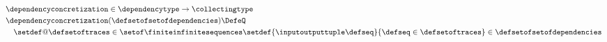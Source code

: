 \begin{align*}
  &\dependencyconcretization \in \dependencytype \to \collectingtype \\
  &\dependencyconcretization(\defsetofsetofdependencies) \DefeQ \\
  &\quad \setdef@{
    \defsetoftraces\in\setof\finiteinfinitesequences
  }{
    \setdef{\inputoutputtuple\defseq}{\defseq\in\defsetoftraces} \in \defsetofsetofdependencies
  }
\end{align*}
